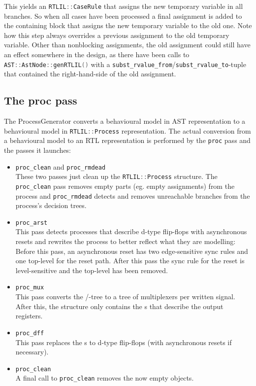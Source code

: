 This yields an \lstinline[language=C++]{RTLIL::CaseRule} that assigns the new temporary variable in all branches.
So when all cases have been processed a final assignment is added to the containing block that assigns the new
temporary variable to the old one. Note how this step always overrides a previous assignment to the old temporary
variable. Other than nonblocking assignments, the old assignment could still have an effect somewhere
in the design, as there have been calls to \lstinline[language=C++]{AST::AstNode::genRTLIL()} with a
\lstinline[language=C++]{subst_rvalue_from}/\lstinline[language=C++]{subst_rvalue_to}-tuple that contained
the right-hand-side of the old assignment.

\subsection{The proc pass}

The ProcessGenerator converts a behavioural model in AST representation to a behavioural model in
\lstinline[language=C++]{RTLIL::Process} representation. The actual conversion from a behavioural
model to an RTL representation is performed by the {\tt proc} pass and the passes it launches:

\begin{itemize}
\item {\tt proc\_clean} and {\tt proc\_rmdead} \\
These two passes just clean up the \lstinline[language=C++]{RTLIL::Process} structure. The {\tt proc\_clean}
pass removes empty parts (eg. empty assignments) from the process and {\tt proc\_rmdead} detects and removes
unreachable branches from the process's decision trees.
%
\item {\tt proc\_arst} \\
This pass detects processes that describe d-type flip-flops with asynchronous
resets and rewrites the process to better reflect what they are modelling:
Before this pass, an asynchronous reset has two edge-sensitive sync rules and
one top-level  for the reset path. After this pass the
sync rule for the reset is level-sensitive and the top-level
 has been removed.
%
\item {\tt proc\_mux} \\
This pass converts the /-tree to a tree
of multiplexers per written signal. After this, the  structure only contains
the s that describe the output registers.
%
\item {\tt proc\_dff} \\
This pass replaces the s to d-type flip-flops (with
asynchronous resets if necessary).
%
\item {\tt proc\_clean} \\
A final call to {\tt proc\_clean} removes the now empty  objects.
\end{itemize}

